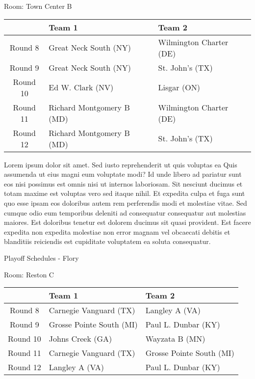 \documentclass{article}%
\begin{document}
\linebreak%
\begin{flushleft}%
\begin{Large}%
Room: Town Center B%
\end{Large}%
\end{flushleft}%
\begin{tabularx}{\textwidth}{|c|Y|Y|}%
\hline%
&Team 1&Team 2\\%
\hline%
Round 8&Great Neck South (NY)&Wilmington Charter (DE)\\%
Round 9&Great Neck South (NY)&St. John's (TX)\\%
Round 10&Ed W. Clark (NV)&Lisgar (ON)\\%
Round 11&Richard Montgomery B (MD)&Wilmington Charter (DE)\\%
Round 12&Richard Montgomery B (MD)&St. John's (TX)\\%
\hline%
\end{tabularx}%
\vspace*{8pt}%
\linebreak%
\newline%
Lorem ipsum dolor sit amet. Sed iusto reprehenderit ut quis voluptas ea Quis assumenda ut eius magni eum voluptate modi? Id unde libero ad pariatur sunt eos nisi possimus est omnis nisi ut internos laboriosam. Sit nesciunt ducimus et totam maxime est voluptas vero sed itaque nihil. Et expedita culpa et fuga sunt quo esse ipsam eos doloribus autem rem perferendis modi et molestiae vitae.\newline%
\newline%
Sed cumque odio eum temporibus deleniti ad consequatur consequatur aut molestias maiores. Est doloribus tenetur est dolorem ducimus sit quasi provident. Est facere expedita non expedita molestiae non error magnam vel obcaecati debitis et blanditiis reiciendis est cupiditate voluptatem ea soluta consequatur.%
\newpage%
\begin{center}%
\begin{Huge}%
Playoff Schedules {-} Flory%
\end{Huge}%
\end{center}%
\begin{flushleft}%
\begin{Large}%
Room: Reston C%
\end{Large}%
\end{flushleft}%
\begin{tabularx}{\textwidth}{|c|Y|Y|}%
\hline%
&Team 1&Team 2\\%
\hline%
Round 8&Carnegie Vanguard (TX)&Langley A (VA)\\%
Round 9&Grosse Pointe South (MI)&Paul L. Dunbar (KY)\\%
Round 10&Johns Creek (GA)&Wayzata B (MN)\\%
Round 11&Carnegie Vanguard (TX)&Grosse Pointe South (MI)\\%
Round 12&Langley A (VA)&Paul L. Dunbar (KY)\\%
\hline%
\end{tabularx}%
\end{document}
